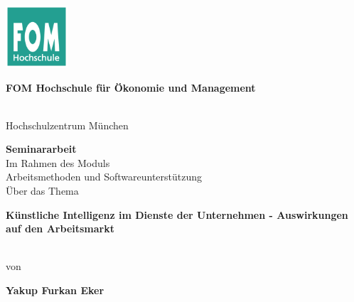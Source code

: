 \newcommand{\Thema}{Künstliche Intelligenz im Dienste der Unternehmen - Auswirkungen auf den Arbeitsmarkt}
\newcommand{\Name}{Yakup Furkan Eker}
\newcommand{\Gutachter}{Dr. techn. Herbert Bauer}
\newcommand{\Matrikelnummer}{594919}
\newcommand{\Abgabedatum}{10.01.2022}




\begin{titlepage}
	\begin{center}
		\includegraphics[width=2.3cm]{assets/fomLogo.pdf}\\
		\vspace{.5cm}
		\begin{Large}\textbf{FOM Hochschule für Ökonomie und Management}\end{Large}\\
		\vspace{.5cm}
		Hochschulzentrum München
																		
		\vspace{2cm}
	\end{center}
																						
	\bigskip	
																																														
	\begin{center}
		\textbf{Seminararbeit}\\
		\vspace{0.2cm}
		Im Rahmen des Moduls\\
		\vspace{0.5cm}
		Arbeitsmethoden und Softwareunterstützung\\
		\vspace{2cm}
		Über das Thema\\
		\vspace{0.5cm}
		\begin{Large}\textbf{\textbf{\Thema}}\end{Large}\\
																
		\vspace{2cm}
		von\\
		\vspace{0.5cm}
		\begin{Large}\textbf{\textbf{\Name}}\end{Large}\\
	\end{center}
																				

\end{titlepage}
